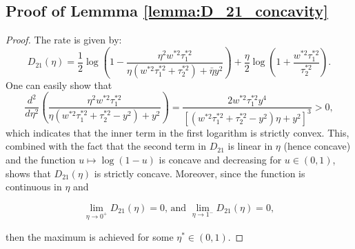 \documentclass[accepted]{uai2026} %
\newcommand{\tsone}{\tau_1^{*2}}
\newcommand{\tstwo}{\tau_2^{*2}}
\theoremstyle{boldremark}
\begin{document}
\subsection{Proof of Lemmma \ref{lemma:D_21_concavity}}
\begin{proof}
    The rate is given by:
\begin{equation}
    D_{21}(\eta) = \frac{1}{2} \log \left( 1 - \frac{\eta^2 w^{*2}\tsone}{ \eta(w^{*2}\tsone+\tstwo) + \bar{\eta} y^2} \right) + \frac{\eta}{2} \log \left(1+\frac{w^{*2}\tsone}{\tstwo} \right).
\end{equation}
One can easily show that 
$$\frac{d^2}{d\eta^2}\left( \frac{\eta^2w^{*2}\tsone}{\eta(w^{*2}\tsone+\tstwo-y^2)+ y^2}\right) = \frac{2w^{*2}\tsone y^4}{[(w^{*2}\tsone+\tstwo-y^2)\eta+y^2]^3} > 0,$$
which indicates that the inner term in the first logarithm is strictly convex. This, combined with the fact that the second term in $D_{21}$ is linear in $\eta$ (hence concave) and the function $u \mapsto \log(1-u)$ is concave and decreasing for $u\in (0,1)$, shows that $D_{21}(\eta)$ is strictly concave. Moreover, since the function is continuous in $\eta$ and 

$$\lim_{\eta \to 0^+}D_{21}(\eta) = 0 \text{, and } \lim_{\eta \to 1^-}D_{21}(\eta) = 0,$$

then the maximum is achieved for some $\eta^* \in (0,1)$.
\end{proof}
\end{document}
